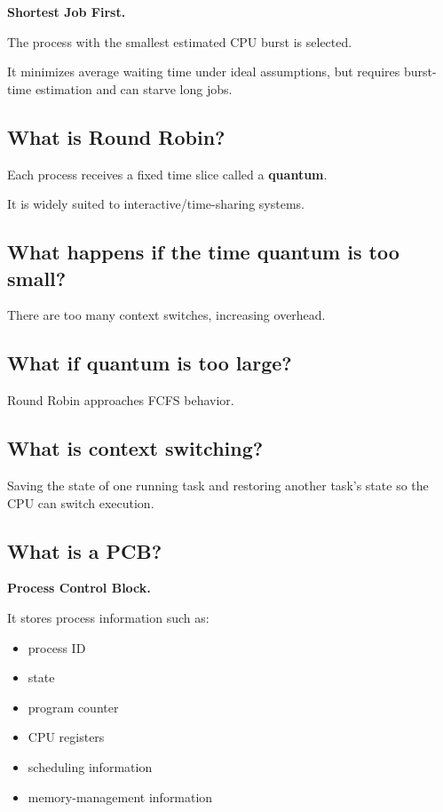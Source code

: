 \textbf{Shortest Job First.}

The process with the smallest estimated CPU burst is selected.

It minimizes average waiting time under ideal assumptions, but requires burst-time estimation and can starve long jobs.

\medskip

\subsection{What is Round Robin?}

Each process receives a fixed time slice called a \textbf{quantum}.

It is widely suited to interactive/time-sharing systems.

\medskip

\subsection{What happens if the time quantum is too small?}

There are too many context switches, increasing overhead.

\medskip

\subsection{What if quantum is too large?}

Round Robin approaches FCFS behavior.

\medskip

\subsection{What is context switching?}

Saving the state of one running task and restoring another task's state so the CPU can switch execution.

\medskip

\subsection{What is a PCB?}

\textbf{Process Control Block.}

It stores process information such as:

\begin{itemize}
  \item process ID
  \item state
  \item program counter
  \item CPU registers
  \item scheduling information
  \item memory-management information
\end{itemize}

